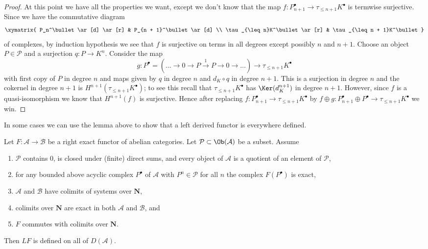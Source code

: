 \begin{proof}
\medskip\noindent
At this point we have all the properties we want, except we don't know
that the map $f : P_{n + 1}^\bullet \to \tau_{\leq n + 1}K^\bullet$
is termwise surjective. Since we have the commutative diagram
$$
\xymatrix{
P_n^\bullet \ar[d] \ar[r] & P_{n + 1}^\bullet \ar[d] \\
\tau_{\leq n}K^\bullet \ar[r] & \tau_{\leq n + 1}K^\bullet
}
$$
of complexes, by induction hypothesis we see that $f$ is surjective
on terms in all degrees except possibly $n$ and $n + 1$. Choose
an object $P \in \mathcal{P}$ and a surjection $q : P \to K^n$.
Consider the map
$$
g :
P^\bullet = (\ldots \to 0 \to P \xrightarrow{1} P \to 0 \to \ldots)
\longrightarrow
\tau_{\leq n + 1}K^\bullet
$$
with first copy of $P$ in degree $n$ and maps given by
$q$ in degree $n$ and $d_K \circ q$ in degree $n + 1$.
This is a surjection in degree $n$ and the cokernel in
degree $n + 1$ is $H^{n + 1}(\tau_{\leq n + 1}K^\bullet)$;
to see this recall that $\tau_{\leq n + 1}K^\bullet$ has
$\Ker(d_K^{n + 1})$ in degree $n + 1$.
However, since $f$ is a quasi-isomorphism we know that
$H^{n + 1}(f)$ is surjective. Hence after replacing 
$f : P_{n + 1}^\bullet \to \tau_{\leq n + 1}K^\bullet$
by
$f \oplus g : P_{n + 1}^\bullet \oplus P^\bullet \to \tau_{\leq n + 1}K^\bullet$
we win.
\end{proof}

\noindent
In some cases we can use the lemma above to show that a left derived
functor is everywhere defined.

\begin{proposition}
\label{proposition-left-derived-exists}
Let $F : \mathcal{A} \to \mathcal{B}$ be a right exact functor
of abelian categories. Let $\mathcal{P} \subset \Ob(\mathcal{A})$ be a
subset. Assume
\begin{enumerate}
\item $\mathcal{P}$ contains $0$, is closed under (finite) direct sums,
and every object of $\mathcal{A}$ is a quotient of an
element of $\mathcal{P}$,
\item for any bounded above acyclic complex $P^\bullet$ of
$\mathcal{A}$ with $P^n \in \mathcal{P}$ for all $n$ the
complex $F(P^\bullet)$ is exact,
\item $\mathcal{A}$ and $\mathcal{B}$ have colimits
of systems over $\mathbf{N}$,
\item colimits over $\mathbf{N}$ are exact in both
$\mathcal{A}$ and $\mathcal{B}$, and
\item $F$ commutes with colimits over $\mathbf{N}$.
\end{enumerate}
Then $LF$ is defined on all of $D(\mathcal{A})$.
\end{proposition}

